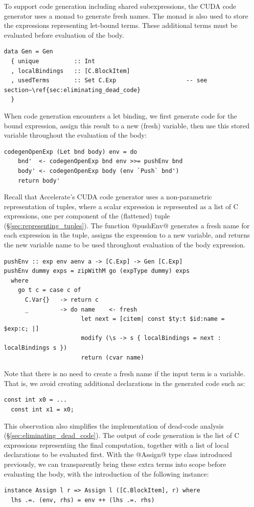 To support code generation including shared subexpressions, the CUDA code
generator uses a monad to generate fresh names. The monad is also used to store
the expressions representing let-bound terms. These additional terms must be
evaluated before evaluation of the body.
%
\begin{lstlisting}[style=haskell]
data Gen = Gen
  { unique          :: Int
  , localBindings   :: [C.BlockItem]
  , usedTerms       :: Set C.Exp                    -- see section~\ref{sec:eliminating_dead_code}
  }
\end{lstlisting}

When code generation encounters a let binding, we first generate code for the
bound expression, assign this result to a new (fresh) variable, then use this
stored variable throughout the evaluation of the body:
%
\begin{lstlisting}[style=haskell]
codegenOpenExp (Let bnd body) env = do
    bnd'  <- codegenOpenExp bnd env >>= pushEnv bnd
    body' <- codegenOpenExp body (env `Push` bnd')
    return body'
\end{lstlisting}

Recall that Accelerate's CUDA code generator uses a non-parametric
representation of tuples, where a scalar expression is represented as a list of
C expressions, one per component of the (flattened) tuple
(\S\ref{sec:representing_tuples}). The function @pushEnv@ generates a fresh
name for each expression in the tuple, assigns the expression to a new variable,
and returns the new variable name to be used throughout evaluation of the body
expression.
%
\begin{lstlisting}[style=haskell]
pushEnv :: exp env aenv a -> [C.Exp] -> Gen [C.Exp]
pushEnv dummy exps = zipWithM go (expType dummy) exps
  where
    go t c = case c of
      C.Var{}   -> return c
      _         -> do name    <- fresh
                      let next = [citem| const $ty:t $id:name = $exp:c; |]
                      modify (\s -> s { localBindings = next : localBindings s })
                      return (cvar name)
\end{lstlisting}
%
Note that there is no need to create a fresh name if the input term is a
variable. That is, we avoid creating additional declarations in the generated
code such as:
%
\begin{lstlisting}[language=cuda]
  const int x0 = ...
  const int x1 = x0;
\end{lstlisting}
%
This observation also simplifies the implementation of dead-code analysis
(\S\ref{sec:eliminating_dead_code}). The output of code generation is the list
of C expressions representing the final computation, together with a list of
local declarations to be evaluated first. With the @Assign@ type class
introduced previously, we can transparently bring these extra terms into scope
before evaluating the body, with the introduction of the following instance:
%
\begin{lstlisting}[style=haskell]
instance Assign l r => Assign l ([C.BlockItem], r) where
  lhs .=. (env, rhs) = env ++ (lhs .=. rhs)
\end{lstlisting}


